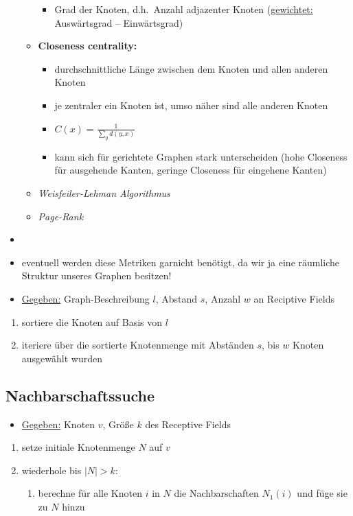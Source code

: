 \begin{itemize}
\begin{itemize}
\begin{itemize}
      \item Grad der Knoten, d.h.\ Anzahl adjazenter Knoten (\underline{gewichtet:} Auswärtsgrad – Einwärtsgrad)
    \end{itemize}
    \item \textbf{Closeness centrality:}
    \begin{itemize}
      \item durchschnittliche Länge zwischen dem Knoten und allen anderen Knoten
      \item je zentraler ein Knoten ist, umso näher sind alle anderen Knoten
      \item $C(x) = \frac{1}{\sum_y d(y,x)}$
      \item kann sich für gerichtete Graphen stark unterscheiden (hohe Closeness für ausgehende Kanten, geringe Closeness für eingehene Kanten)
    \end{itemize}
    \item \emph{Weisfeiler-Lehman Algorithmus}
    \item \emph{Page-Rank}
  \end{itemize}
  \item {}
  \item eventuell werden diese Metriken garnicht benötigt, da wir ja eine räumliche Struktur unseres Graphen besitzen!
  \item \underline{Gegeben:} Graph-Beschreibung $l$, Abstand $s$, Anzahl $w$ an Reciptive Fields
\end{itemize}

\begin{enumerate}
  \item sortiere die Knoten auf Basis von $l$
  \item iteriere über die sortierte Knotenmenge mit Abständen $s$, bis $w$ Knoten ausgewählt wurden
\end{enumerate}

\subsection{Nachbarschaftssuche}

\begin{itemize}
  \item \underline{Gegeben:} Knoten $v$, Größe $k$ des Receptive Fields
\end{itemize}

\begin{enumerate}
  \item setze initiale Knotenmenge $N$ auf $v$
  \item wiederhole bis $|N| > k$:
    \begin{enumerate}
      \item berechne für alle Knoten $i$ in $N$ die Nachbarschaften $N_1(i)$ und füge sie zu $N$ hinzu
    \end{enumerate}
\end{enumerate}

